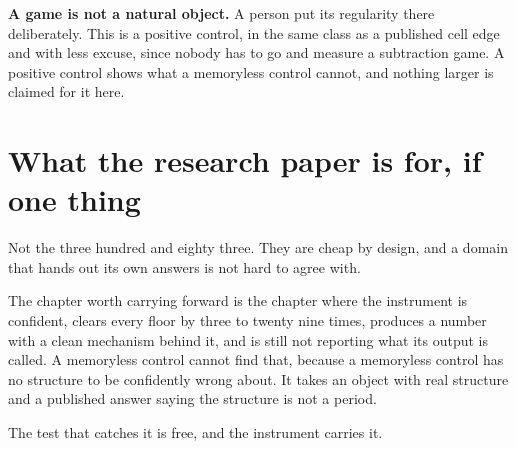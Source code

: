 \textbf{A game is not a natural object.} A person put its regularity there deliberately. This is a
positive control, in the same class as a published cell edge and with less excuse, since nobody has
to go and measure a subtraction game. A positive control shows what a memoryless control cannot, and
nothing larger is claimed for it here.

\section{What the research paper is for, if one thing}

Not the three hundred and eighty three. They are cheap by design, and a domain that hands out its
own answers is not hard to agree with.

The chapter worth carrying forward is the chapter where the instrument is confident, clears every
floor by three to twenty nine times, produces a number with a clean mechanism behind it, and is
still not reporting what its output is called. A memoryless control cannot find that, because a
memoryless control has no structure to be confidently wrong about. It takes an
object with real structure and a published answer saying the structure is not a period.

The test that catches it is free, and the instrument carries it.
